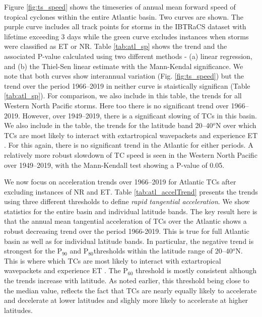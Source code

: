 \documentclass[wcd,manuscript]{copernicus}
\begin{document}
Figure \ref{fig:ts_speed} shows the timeseries of annual mean forward speed of tropical cyclones within the entire Atlantic basin. Two curves are shown. The purple curve includes all track points for storms in the IBTRaCS dataset with lifetime exceeding 3 days while the green curve excludes instances when storms were classified as ET or NR. Table \ref{tab:atl_sp} shows the trend and the associated P-value calculated using two different methods - (a) linear regression, and (b) the Thiel-Sen linear estimate with the Mann-Kendal significance. We note that both curves show interannual variation (Fig. \ref{fig:ts_speed}) but the trend over the period 1966--2019 in neither curve is staistically significan (Table \ref{tab:atl_sp}). For comparison, we also include in this table, the trends for all Western North Pacific storms. Here too there is no significant trend over 1966--2019. However, over 1949--2019, there is a significant slowing of TCs in this basin. We also include in the table, the trends for the latitude band 20--40$^o$N over which TCs are most likely to interact with extartropical wavepackets and experience ET \citep[e.g.][]{HE2001}. For this again, there is no significant trend in the Atlantic for either periods. A relatively more robust slowdown of TC speed is seen in the Western North Pacific over  1949--2019, with the Mann-Kendall test showing a P-value of 0.05.



We now focus on acceleration trends over 1966--2019 for Atlantic TCs after excluding instances of NR and ET. Table \ref{tab:atl_accelTrend} presents the trends using three different thresholds to define \emph{rapid tangential acceleration}. We show statistics for the entire basin and individual latitude bands. The key result here is that the annual mean tangential acceleration of TCs over the Atlantic shows a robust decreasing trend over the period 1966-2019. This is true for full Atlantic basin as well as for individual latitude bands. In particular, the negative trend is strongest for the P$_{90}$ and P$_{80}$thresholds within the latitude range of 20--40$^o$N. This is where which TCs are most likely to interact with extartropical wavepackets and experience ET \citep[e.g.][]{HE2001}. The P$_{60}$ threshold is mostly consistent although the trends increase with latitude. As noted earlier, this threshold being close to the median value, reflects the fact that TCs are nearly equally likely to accelerate and decelerate at lower latitudes and slighly more likely to accelerate at higher latitudes. 
\end{document}
